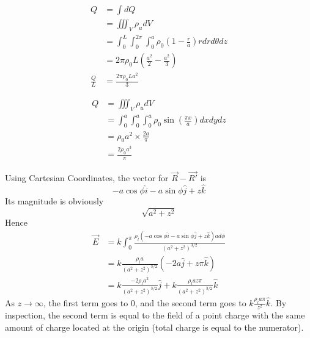 \documentclass[answers]{exam}
\begin{document}
\begin{questions}
\begin{solution}
	\begin{align*}
		Q &= \int dQ \\
		  &= \iiint_V \rho_u dV \\
		  &= \int_0^L\int_0^{2\pi}\int_0^a \rho_0\left(1-\frac{r}{a}\right) rdr d\theta dz \\
		  &= 2\pi\rho_0L\left(\frac{a^2}{2}-\frac{a^2}{3}\right) \\
		\frac{Q}{L} &= \frac{2\pi\rho_0La^2}{3}
	\end{align*}
\end{solution}


\begin{solution}
	\begin{align*}
		Q &= \iiint_V \rho_u dV \\
		  &= \int_0^a\int_0^a\int_0^a \rho_0\sin\left(\frac{\pi x}{a}\right)dxdydz \\
		  &= \rho_0a^2\times \frac{2a}{\pi} \\
		  &= \frac{2\rho_0a^3}{\pi}
	\end{align*}
\end{solution}


\begin{solution}
	Using Cartesian Coordinates, the vector for $\vec{R}-\vec{R'}$ is
	$$-a\cos\phi\hat{i} - a\sin\phi\hat{j} + z\hat{k}$$
	Its magnitude is obviously
	$$\sqrt{a^2+z^2}$$
	Hence
	\begin{align*}
		\vec{E} &= k\int_0^\pi \frac{\rho_l(-a\cos\phi\hat{i} - a\sin\phi\hat{j} + z\hat{k})ad\phi}{(a^2+z^2)^{3/2}} \\
			&= k\frac{\rho_la}{(a^2+z^2)^{3/2}}(-2a\hat{j} + z\pi\hat{k}) \\
			&= k\frac{-2\rho_la^2}{(a^2+z^2)^{3/2}}\hat{j} + k\frac{\rho_laz\pi}{(a^2+z^2)^{3/2}}\hat{k}
	\end{align*}
	As $z\rightarrow\infty$, the first term goes to 0, and the second term goes to $k\frac{\rho_la\pi}{z^2}\hat{k}$. By inspection, the second term is equal to the field of a point charge with the same amount of charge located at the origin (total charge is equal to the numerator).
\end{solution}


\end{questions}
\end{document}
